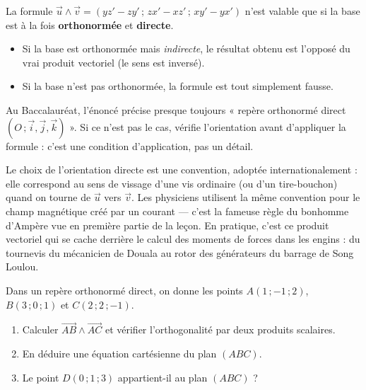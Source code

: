 \documentclass[11pt]{article}
\begin{document}
\begin{attention}
La formule $\vec{u} \wedge \vec{v} = (yz' - zy'\,;\, zx' - xz'\,;\, xy' - yx')$ n'est valable que si la base est à la fois \textbf{orthonormée} et \textbf{directe}.
\begin{itemize}
\item Si la base est orthonormée mais \emph{indirecte}, le résultat obtenu est l'opposé du vrai produit vectoriel (le sens est inversé).
\item Si la base n'est pas orthonormée, la formule est tout simplement fausse.
\end{itemize}
Au Baccalauréat, l'énoncé précise presque toujours « repère orthonormé direct $(O\,; \vec{i}, \vec{j}, \vec{k})$ ». Si ce n'est pas le cas, vérifie l'orientation avant d'appliquer la formule : c'est une condition d'application, pas un détail.
\end{attention}

\begin{savaistu}
Le choix de l'orientation directe est une convention, adoptée internationalement : elle correspond au sens de vissage d'une vis ordinaire (ou d'un tire-bouchon) quand on tourne de $\vec{u}$ vers $\vec{v}$. Les physiciens utilisent la même convention pour le champ magnétique créé par un courant — c'est la fameuse règle du bonhomme d'Ampère vue en première partie de la leçon. En pratique, c'est ce produit vectoriel qui se cache derrière le calcul des moments de forces dans les engins : du tournevis du mécanicien de Douala au rotor des générateurs du barrage de Song Loulou.
\end{savaistu}

\begin{exercice}
Dans un repère orthonormé direct, on donne les points $A(1\,; -1\,; 2)$, $B(3\,; 0\,; 1)$ et $C(2\,; 2\,; -1)$.
\begin{enumerate}
\item Calculer $\overrightarrow{AB} \wedge \overrightarrow{AC}$ et vérifier l'orthogonalité par deux produits scalaires.
\item En déduire une équation cartésienne du plan $(ABC)$.
\item Le point $D(0\,; 1\,; 3)$ appartient-il au plan $(ABC)$ ?
\end{enumerate}
\end{exercice}
\end{document}
